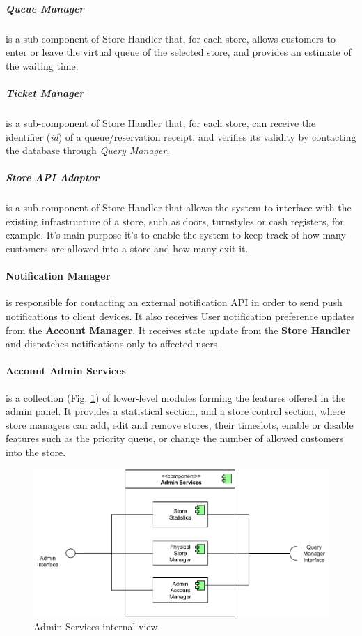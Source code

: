 \subparagraph{Queue Manager} is a sub-component of Store Handler that, for each store, allows customers to enter or leave the virtual queue of the selected store, and provides an estimate of the waiting time.

\subparagraph{Ticket Manager} is a sub-component of Store Handler that, for each store, can receive the identifier (\emph{id}) of a queue/reservation receipt, and verifies its validity by contacting the database through \emph{Query Manager}.

\subparagraph{Store API Adaptor} is a sub-component of Store Handler that allows the system to interface with the existing infrastructure of a store, such as doors, turnstyles or cash registers, for example. It's main purpose it's to enable the system to keep track of how many customers are allowed into a store and how many exit it.

\paragraph{Notification Manager} is responsible for contacting an external notification API in order to send push notifications to client devices. It also receives User notification preference updates from the \textbf{Account Manager}. It receives state update from the \textbf{Store Handler} and dispatches notifications only to affected users.

\paragraph{Account Admin Services} is a collection (Fig. \ref{fig:admin_services}) of lower-level modules forming the features offered in the admin panel. It provides a statistical section, and a store control section, where store managers can add, edit and remove stores, their timeslots, enable or disable features such as the priority queue, or change the number of allowed customers into the store.

\begin{figure}[H]
    \centering
    \includegraphics[width=0.8\linewidth]{images/draw.io/admin_services.pdf}
    \caption{Admin Services internal view}
    \label{fig:admin_services}
\end{figure}

